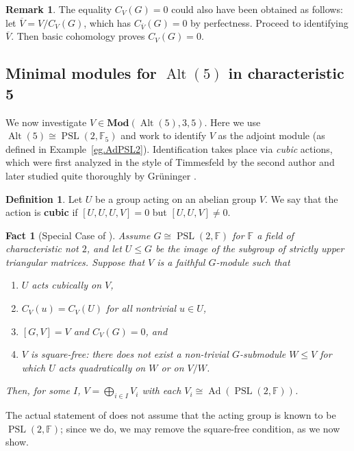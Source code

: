 \documentclass[a4paper, 11pt]{amsart}
\theoremstyle{plain}
\newtheorem{fact}[theorem]{Fact}
\theoremstyle{definition}
\newtheorem{definition}[theorem]{Definition}
\newtheorem{remark}[theorem]{Remark}
\theoremstyle{remark}
\DeclareMathOperator{\Alt}{Alt}
\DeclareMathOperator{\PSL}{PSL}
\DeclareMathOperator{\Ad}{Ad}
\newcommand{\Mod}{\mathbf{Mod}}
\newcommand{\bF}{\mathbb{F}}
\begin{document}
\begin{remark}
The equality $C_V(G) = 0$ could also have been obtained as follows: let $\overline{V} = V/C_V(G)$, which has $C_{\overline{V}}(G) = 0$ by perfectness. Proceed to identifying $\overline{V}$. Then basic cohomology proves $C_V(G) = 0$.
\end{remark}


\subsection{Minimal modules for \texorpdfstring{$\Alt(5)$}{Alt(5)} in characteristic 5}

We now investigate $V\in \Mod(\Alt(5),3,5)$. Here we use $\Alt(5)\cong \PSL(2,\bF_5)$ and work to identify $V$ as the adjoint module (as defined in Example~\ref{eg.AdPSL2}). Identification takes place via \emph{cubic} actions, which were first analyzed in the style of Timmesfeld by the second author \cite{DeA16} and later studied quite thoroughly by Gr\"uninger \cite{GrM22}.

\begin{definition}
Let $U$ be a group acting on an abelian group $V$. We say that the action is \textbf{cubic} if $[U,U,U,V] = 0$ but $[U,U,V] \neq 0$.
\end{definition}

\begin{fact}[Special Case of {\cite[Theorem~8.1]{GrM22}}]\label{fact.Ad(PSL2)}
Assume $G\cong \PSL(2,\bF)$ for $\bF$ a field of characteristic not $2$, and let $U\le G$ be the image of the subgroup of strictly upper triangular matrices. Suppose that   $V$ is a faithful $G$-module such that
\begin{enumerate}
    \item $U$ acts cubically on $V$, 
    \item\label{fact.Ad(PSL2).i:C_V(u)} $C_V(u) = C_V(U)$ for all nontrivial $u\in U$,
    \item $[G,V] = V$ and $C_V(G) = 0$, and
    \item $V$ is \emph{square-free}: there does not exist a non-trivial $G$-submodule $W\le V$ for which $U$ acts quadratically on $W$ or on $V/W$.
\end{enumerate}
Then, for some  $I$, $V= \bigoplus_{i\in I} V_i$ with each  $V_i \cong \Ad(\PSL(2,\bF))$.
\end{fact}

The actual statement of \cite[Theorem~8.1]{GrM22} does not assume that the acting group is known to be  $\PSL(2,\bF)$; since we do, we may  remove the square-free condition, as we now show.
\end{document}
